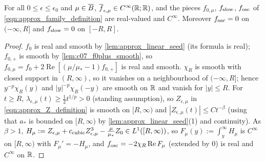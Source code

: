 \begin{lemma}
  \label{lem:c07_family_smooth}
  For all $0\le\epsilon\le\epsilon_0$ and $\mu\in\overline{B}$, $\overline{f}_{\epsilon,\mu}\in C^\infty(\mathbb{R};\mathbb{R})$, and the
  pieces $f_{0,\mu}$, $f_{\textup{slow}}$, $f_{\textup{osc}}$ of \eqref{eqn:approx_family_definition} are real-valued and $C^\infty$.
  Moreover $f_{\textup{osc}}=0$ on $(-\infty,R]$ and $f_{\textup{slow}}=0$ on $[-R,R]$.
\end{lemma}
\begin{proof}
  $f_0$ is real and smooth by \cref{lem:approx_linear_seed} (its formula is real);
  $f_{0,+}$ is smooth by \cref{lem:c07_f0plus_smooth}, so $f_{0,\mu}=f_0+2\operatorname{Re}[(\mu/\mu_*-1)f_{0,+}]$ is real and smooth.
  $\chi_R$ is smooth with closed support in $(R,\infty)$, so it vanishes on a neighbourhood of
  $(-\infty,R]$; hence $y^{-p}\chi_R(y)$ and $|y|^{-p}\chi_R(-y)$ are smooth on $\mathbb{R}$ and vanish for
  $|y|\le R$. For $t\ge R$, $\lambda_{\epsilon,\mu}(t)\geq\frac12t^{1/p}>0$ (standing assumption), so
  $Z_{\epsilon,\mu}$ in \eqref{eqn:approx_Z_definition} is smooth on $[R,\infty)$ and
  $|Z_{\epsilon,\mu}(t)|\le Ct^{-\beta}$ (using that $a_*$ is bounded on $[R,\infty)$ by \cref{lem:approx_linear_seed}(1)
  and continuity). As $\beta>1$, $H_\mu:=Z_{\epsilon,\mu}+c_{\textup{cubic}}Z_{\epsilon,\mu}^3-\frac{\mu}{\mu_*}Z_0\in L^1([R,\infty))$,
  so $F_\mu(y):=\int_y^\infty H_\mu$ is $C^\infty$ on $[R,\infty)$ with $F_\mu'=-H_\mu$, and
  $f_{\textup{osc}}=-2\chi_R\operatorname{Re}F_\mu$ (extended by $0$) is real and $C^\infty$ on $\mathbb{R}$.
\end{proof}

